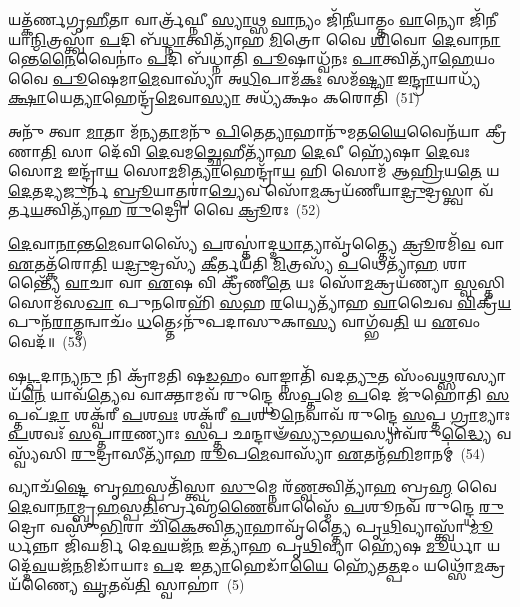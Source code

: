 𑌯𑌤𑍍𑌕᳴𑌰𑍍𑌣𑌗𑍃\-\ul{𑌹𑍀}\-𑌤𑌾 𑌵𑌾𑌰𑍍𑌤𑍍𑌰᳴𑌘𑍍𑌨𑍀 \ul{𑌸𑍍𑌯𑌾}\-𑌥𑍍𑌸 \ul{𑌵𑌾}\-𑌨𑍍𑌯𑌂 𑌜𑌿᳴\-\ul{𑌨𑍀}\-𑌯𑌾𑌤𑍍𑌤𑌂 \ul{𑌵𑌾}\-𑌨𑍍𑌯𑍋 𑌜𑌿᳴𑌨𑍀𑌯𑌾\-\ul{𑌨𑍍𑌮𑌿}\-𑌤𑍍𑌰𑌸𑍍𑌤𑍍𑌵𑌾᳴ \ul{𑌪}\-𑌦𑌿 𑌬᳴\-\ul{𑌧𑍍𑌨𑌾}\-𑌤𑍍𑌵𑌿𑌤𑍍𑌯𑌾᳴𑌹 \ul{𑌮𑌿}\-𑌤𑍍𑌰𑍋 𑌵𑍈 \ul{𑌶𑌿}\-𑌵𑍋 \ul{𑌦𑍇}\-𑌵𑌾\-\ul{𑌨𑌾}\-𑌨𑍍𑌤𑍇\-\ul{𑌨𑍈}\-𑌵𑍈𑌨𑌾𑌂॑ \ul{𑌪}\-𑌦𑌿 𑌬᳴𑌧𑍍𑌨𑌾𑌤𑌿 \ul{𑌪𑍂}\-𑌷𑌾𑌧𑍍𑌵᳴𑌨𑌃 \ul{𑌪𑌾}\-𑌤𑍍𑌵𑌿𑌤𑍍𑌯𑌾᳴\-\ul{𑌹𑍇}\-𑌯𑌂 𑌵𑍈 \ul{𑌪𑍂}\-𑌷𑍇𑌮𑌾\-\ul{𑌮𑍇}\-𑌵𑌾𑌸𑍍𑌯𑌾᳴ 𑌅\-\ul{𑌧𑌿}\-𑌪𑌾𑌮᳴\-\ul{𑌕𑌃} 𑌸𑌮᳴\-\ul{𑌷𑍍𑌟𑍍𑌯𑌾} 𑌇\-\ul{𑌨𑍍𑌦𑍍𑌰𑌾}\-𑌯𑌾𑌧𑍍𑌯᳴\-\ul{𑌕𑍍𑌷𑌾}\-𑌯𑍇\-\ul{𑌤𑍍𑌯𑌾}\-𑌹𑍇𑌨𑍍𑌦𑍍𑌰᳴\-\ul{𑌮𑍇}\-𑌵𑌾\-\ul{𑌸𑍍𑌯𑌾} 𑌅𑌧𑍍𑌯᳴𑌕𑍍𑌷𑌂 𑌕𑌰𑍋𑌤𑌿~(51)

𑌅𑌨𑍁᳴ 𑌤𑍍𑌵𑌾 \ul{𑌮𑌾}\-𑌤𑌾 𑌮᳴𑌨𑍍𑌯\-\ul{𑌤𑌾}\-𑌮𑌨𑍁᳴ \ul{𑌪𑌿}\-𑌤𑍇\-\ul{𑌤𑍍𑌯𑌾}\-𑌹𑌾𑌨𑍁᳴𑌮𑌤\-\ul{𑌯𑍈}\-𑌵𑍈𑌨᳴𑌯𑌾 𑌕𑍍𑌰𑍀𑌣𑌾\-\ul{𑌤𑌿} 𑌸𑌾 𑌦𑍇᳴𑌵𑌿 \ul{𑌦𑍇}\-𑌵𑌮\-\ul{𑌚𑍍𑌛𑍇}\-𑌹𑍀𑌤𑍍𑌯𑌾᳴𑌹 \ul{𑌦𑍇}\-𑌵𑍀 𑌹𑍍𑌯𑍇᳴𑌷𑌾 \ul{𑌦𑍇}\-𑌵𑌃 𑌸𑍋\-\ul{𑌮} 𑌇𑌨𑍍𑌦𑍍𑌰𑌾᳴\-\ul{𑌯} 𑌸𑍋\-\ul{𑌮}\-𑌮𑌿\-\ul{𑌤𑍍𑌯𑌾}\-𑌹𑍇𑌨𑍍𑌦𑍍𑌰𑌾᳴\-\ul{𑌯} 𑌹𑌿 𑌸𑍋𑌮᳴ 𑌆\-\ul{𑌹𑍍𑌰𑌿}\-𑌯\-\ul{𑌤𑍇} 𑌯\-\ul{𑌦𑍇}\-𑌤𑌦𑍍𑌯\-\ul{𑌜𑍁}\-𑌰𑍍𑌨 \ul{𑌬𑍍𑌰𑍂}\-𑌯𑌾𑌤𑍍𑌪𑌰𑌾॑\-\ul{𑌚𑍍𑌯𑍇}\-𑌵 𑌸𑍋᳴\-\ul{𑌮}\-𑌕𑍍𑌰𑌯᳴𑌣𑍀𑌯𑌾\-\ul{𑌦𑍍𑌰𑍁}\-𑌦𑍍𑌰𑌸𑍍𑌤𑍍𑌵𑌾 𑌵᳴𑌰𑍍𑌤\-\ul{𑌯}\-𑌤𑍍𑌵𑌿𑌤𑍍𑌯𑌾᳴𑌹 \ul{𑌰𑍁}\-𑌦𑍍𑌰𑍋 𑌵𑍈 \ul{𑌕𑍍𑌰𑍂}\-𑌰𑌃~(52)

\-\ul{𑌦𑍇}\-𑌵𑌾\-\ul{𑌨𑌾}\-𑌨𑍍𑌤\-\ul{𑌮𑍇}\-𑌵𑌾𑌸𑍍𑌯𑍈᳴ \ul{𑌪}\-𑌰𑌸𑍍𑌤𑌾॑𑌦𑍍𑌦\-\ul{𑌧𑌾}\-𑌤𑍍𑌯𑌾𑌵𑍃᳴𑌤𑍍𑌤𑍍𑌯𑍈 \ul{𑌕𑍍𑌰𑍂}\-𑌰𑌮𑌿᳴\-\ul{𑌵} 𑌵𑌾 \ul{𑌏}\-𑌤𑌤𑍍𑌕᳴𑌰𑍋\-\ul{𑌤𑌿} 𑌯\-\ul{𑌦𑍍𑌰𑍁}\-𑌦𑍍𑌰𑌸𑍍𑌯᳴ \ul{𑌕𑍀}\-𑌰𑍍𑌤𑌯᳴𑌤𑌿 \ul{𑌮𑌿}\-𑌤𑍍𑌰𑌸𑍍𑌯᳴ \ul{𑌪}\-𑌥𑍇𑌤𑍍𑌯𑌾᳴\-\ul{𑌹} 𑌶𑌾𑌨𑍍𑌤𑍍𑌯𑍈᳴ \ul{𑌵𑌾}\-𑌚𑌾 𑌵𑌾 \ul{𑌏}\-𑌷 𑌵𑌿 𑌕𑍍𑌰𑍀᳴𑌣𑍀\-\ul{𑌤𑍇} 𑌯𑌃 𑌸𑍋᳴\-\ul{𑌮}\-𑌕𑍍𑌰𑌯᳴𑌣𑍍𑌯𑌾 \ul{𑌸𑍍𑌵}\-𑌸𑍍𑌤𑌿 𑌸𑍋𑌮᳴𑌸\-\ul{𑌖𑌾} 𑌪𑍁\-\ul{𑌨}\-𑌰𑍇𑌹𑌿᳴ \ul{𑌸}\-𑌹 \ul{𑌰}\-𑌯𑍍𑌯𑍇𑌤𑍍𑌯𑌾᳴𑌹 \ul{𑌵𑌾}\-𑌚𑍈𑌵 \ul{𑌵𑌿}\-𑌕𑍍𑌰𑍀\-\ul{𑌯} 𑌪𑍁𑌨᳴\-\ul{𑌰𑌾}\-𑌤𑍍𑌮𑌨𑍍𑌵𑌾𑌚𑌂᳴ \ul{𑌧}\-𑌤𑍍𑌤𑍇\-𑌽𑌨𑍁᳴𑌪𑌦𑌾𑌸𑍁𑌕𑌾\-\ul{𑌸𑍍𑌯} 𑌵𑌾𑌗𑍍𑌭᳴𑌵\-\ul{𑌤𑌿} 𑌯 \ul{𑌏}\-𑌵𑌂 𑌵𑍇𑌦᳴॥~(53)

{\anuvakamend[{𑌸𑌤᳴\-\ul{𑌨𑍁𑌂} 𑌵𑌿𑌷𑍍𑌣᳴\-\ul{𑌵} 𑌇𑌤𑍍𑌯𑌾᳴𑌹 \ul{𑌸}\-𑌮𑌾𑌰𑍋᳴𑌹\-\ul{𑌤𑌿} 𑌧𑍍𑌯𑌾𑌯᳴\-\ul{𑌤𑌿} 𑌤\-\ul{𑌦𑍍𑌵𑌾}\-𑌚𑌾 𑌯𑌜᳴𑌮𑌾𑌨𑌃 𑌸𑍍𑌯𑌾𑌤𑍍𑌕𑌰𑍋𑌤𑌿 \ul{𑌕𑍍𑌰𑍂}\-𑌰𑍋 𑌵𑍇𑌦᳴}]}%

𑌷\-\ul{𑌟𑍍𑌪}\-𑌦𑌾𑌨𑍍𑌯\-\ul{𑌨𑍁} 𑌨𑌿 𑌕𑍍𑌰𑌾᳴𑌮𑌤𑌿 𑌷\-\ul{𑌡}\-𑌹𑌂 𑌵𑌾𑌙𑍍𑌨𑌾𑌤𑌿᳴ 𑌵𑌦\-\ul{𑌤𑍍𑌯𑍁}\-𑌤 𑌸𑌂᳴𑌵\-\ul{𑌥𑍍𑌸}\-𑌰𑌸𑍍𑌯𑌾𑌯᳴\-\ul{𑌨𑍇} 𑌯𑌾𑌵᳴\-\ul{𑌤𑍍𑌯𑍇}\-𑌵 𑌵𑌾𑌕𑍍𑌤𑌾𑌮𑌵᳴ 𑌰𑍁𑌨𑍍𑌦𑍍𑌧𑍇 𑌸\-\ul{𑌪𑍍𑌤}\-𑌮𑍇 \ul{𑌪}\-𑌦𑍇 𑌜𑍁᳴𑌹𑍋𑌤𑌿 \ul{𑌸}\-𑌪𑍍𑌤𑌪᳴\-\ul{𑌦𑌾} 𑌶𑌕𑍍𑌵᳴𑌰𑍀 \ul{𑌪}\-𑌶\-\ul{𑌵𑌃} 𑌶𑌕𑍍𑌵᳴𑌰𑍀 \ul{𑌪}\-𑌶𑍂\-\ul{𑌨𑍇}\-𑌵𑌾𑌵᳴ 𑌰𑍁𑌨𑍍𑌦𑍍𑌧𑍇 \ul{𑌸}\-𑌪𑍍𑌤 \ul{𑌗𑍍𑌰𑌾}\-𑌮𑍍𑌯𑌾𑌃 \ul{𑌪}\-𑌶𑌵𑌃᳴ \ul{𑌸}\-𑌪𑍍𑌤𑌾\-\ul{𑌰}\-𑌣𑍍𑌯𑌾𑌃 \ul{𑌸}\-𑌪𑍍𑌤 𑌛𑌨𑍍𑌦𑌾𑍟᳴\-\ul{𑌸𑍍𑌯𑍁}\-𑌭\-\ul{𑌯}\-𑌸𑍍𑌯𑌾𑌵᳴𑌰𑍁\-\ul{𑌦𑍍𑌧𑍍𑌯𑍈} 𑌵𑌸𑍍𑌵𑍍𑌯᳴𑌸𑌿 \ul{𑌰𑍁}\-𑌦𑍍𑌰𑌾𑌸𑍀𑌤𑍍𑌯𑌾᳴𑌹 \ul{𑌰𑍂}\-𑌪\-\ul{𑌮𑍇}\-𑌵𑌾𑌸𑍍𑌯𑌾᳴ \ul{𑌏}\-𑌤𑌨𑍍𑌮᳴\-\ul{𑌹𑌿}\-𑌮𑌾𑌨𑌮𑍍॑~(54)

𑌵𑍍𑌯𑌾𑌚᳴\-\ul{𑌷𑍍𑌟𑍇} 𑌬𑍃\-\ul{𑌹}\-𑌸𑍍𑌪𑌤𑌿᳴𑌸𑍍𑌤𑍍𑌵𑌾 \ul{𑌸𑍁}\-𑌮𑍍𑌨𑍇 𑌰᳴\-\ul{𑌣𑍍𑌵}\-𑌤𑍍𑌵𑌿𑌤𑍍𑌯𑌾᳴\-\ul{𑌹} 𑌬𑍍𑌰\-\ul{𑌹𑍍𑌮} 𑌵𑍈 \ul{𑌦𑍇}\-𑌵𑌾\-\ul{𑌨𑌾}\-𑌮𑍍𑌬𑍃\-\ul{𑌹}\-𑌸𑍍𑌪\-\ul{𑌤𑌿}\-𑌰𑍍𑌬𑍍𑌰𑌹𑍍𑌮᳴\-\ul{𑌣𑍈}\-𑌵𑌾𑌸𑍍𑌮𑍈᳴ \ul{𑌪}\-𑌶𑍂𑌨𑌵᳴ 𑌰𑍁𑌨𑍍𑌦𑍍𑌧𑍇 \ul{𑌰𑍁}\-𑌦𑍍𑌰𑍋 𑌵𑌸𑍁᳴\-\ul{𑌭𑌿}\-𑌰𑌾 𑌚𑌿᳴\-\ul{𑌕𑍇}\-𑌤𑍍𑌵𑌿\-\ul{𑌤𑍍𑌯𑌾}\-𑌹𑌾𑌵𑍃᳴𑌤𑍍𑌤𑍍𑌯𑍈 𑌪𑍃\-\ul{𑌥𑌿}\-𑌵𑍍𑌯𑌾𑌸𑍍𑌤𑍍𑌵𑌾᳴ \ul{𑌮𑍂}\-𑌰𑍍𑌧𑌨𑍍𑌨𑌾 𑌜𑌿᳴𑌘𑌰𑍍𑌮𑌿 𑌦𑍇\-\ul{𑌵}\-𑌯𑌜᳴\-\ul{𑌨} 𑌇𑌤𑍍𑌯𑌾᳴𑌹 𑌪𑍃\-\ul{𑌥𑌿}\-𑌵𑍍𑌯𑌾 𑌹𑍍𑌯𑍇᳴𑌷 \ul{𑌮𑍂}\-𑌰𑍍𑌧𑌾 𑌯𑌦𑍍𑌦𑍇᳴\-\ul{𑌵}\-𑌯𑌜᳴\-\ul{𑌨}\-𑌮𑌿𑌡𑌾᳴𑌯𑌾𑌃 \ul{𑌪}\-𑌦 𑌇\-\ul{𑌤𑍍𑌯𑌾}\-𑌹𑍇𑌡𑌾᳴\-\ul{𑌯𑍈} 𑌹𑍍𑌯𑍇᳴𑌤\-\ul{𑌤𑍍𑌪}\-𑌦𑌂 𑌯𑌥𑍍𑌸𑍋᳴\-\ul{𑌮}\-𑌕𑍍𑌰𑌯᳴𑌣𑍍𑌯𑍈 \ul{𑌘𑍃}\-𑌤𑌵᳴\-\ul{𑌤𑌿} 𑌸𑍍𑌵𑌾𑌹𑌾॑~(5)

